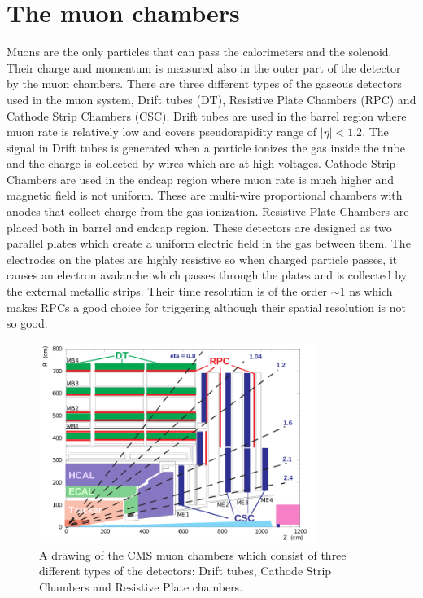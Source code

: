 
\section{The muon chambers}

Muons are the only particles that can pass the calorimeters and the solenoid. Their charge and momentum is measured also in the outer part of the detector by the muon chambers. There are three different types of the gaseous detectors used in the muon system, Drift tubes (DT), Resistive Plate Chambers (RPC) and Cathode Strip Chambers (CSC). Drift tubes are used in the barrel region where muon rate is relatively low and covers pseudorapidity range of $|\eta|<1.2$. The signal in Drift tubes is generated when a particle ionizes the gas inside the tube and the charge is collected by wires which are at high voltages. Cathode Strip Chambers are used in the endcap region where muon rate is much higher and magnetic field is not uniform. These are multi-wire proportional chambers with anodes that collect charge from the gas ionization. Resistive Plate Chambers are placed both in barrel and endcap region. These detectors are designed as two parallel plates which create a uniform electric field in the gas between them. The electrodes on the plates are highly resistive so  when charged particle passes, it causes an electron avalanche which passes through the plates and is collected by the external metallic strips. Their time resolution is of the order $\sim$1 ns which makes RPCs a good choice for triggering although their spatial resolution is not so good.
\begin{figure}[htbp]
	\centering
		\includegraphics[width=0.8\textwidth]{Figures/Muon_chambres.png}
	\caption[CMS Muon Chambers]{A drawing of the CMS muon chambers which consist of three different types of the detectors: Drift tubes, Cathode Strip Chambers and Resistive Plate chambers. \cite{Chatrchyan:2008aa}}
	\label{fig:Mu}
\end{figure} 
